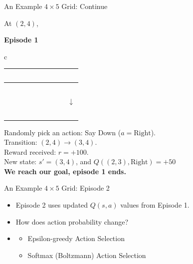 \documentclass[aspectratio=169,xcolor=dvipsnames,svgnames,x11names,fleqn]{beamer}
\begin{document}
    \begin{frame}{An Example $4\times 5$ Grid: Continue}
        \begin{center}
            At $(2,4)$, 
            
            \vspace{0.5cm}
        
            \textbf{Episode 1}
            
            \vspace{0.5cm}
        
            \begin{tabular}{c}
                 \\
                \begin{tabular}{|c|c|c|c|c|}
                \hline
                ~~ &  ~~ &  ~~  & ~~ & \cellcolor{red!25} \\ %
                \hline
                ~~ & ~~ & \cellcolor{black}  &  ~~ &  ~~  \\ 
                \hline
                ~~ &  & ~~ & ~~ & \footnotesize \faStar $\downarrow$ \\ %
                \hline
                ~~ & ~~  &  ~~ & ~~ & \cellcolor{red!25}  \\ %
                \hline
                \end{tabular}
            \end{tabular}
        
            Randomly pick an action: Say Down ($a = \text{Right}$). \\
            Transition: $(2,4) \rightarrow (3,4)$. \\
            Reward received: $r = +100$. \\
            New state: $s' = (3,4)$, and $Q((2,3), \text{Right})  = +50$\\
            
            \textbf{We reach our goal, episode 1 ends.}
            
        \end{center}
    \end{frame}

    \begin{frame}{An Example $4\times 5$ Grid: Episode 2}
        \Large 
        \begin{itemize}
            \item Episode 2 uses updated $Q(s,a)$ values from Episode 1.
            \item How does action probability change?
            \item \begin{itemize}
                \item Epsilon-greedy Action Selection
                \item Softmax (Boltzmann) Action Selection
            \end{itemize}
        \end{itemize}
    \end{frame}
\end{document}
